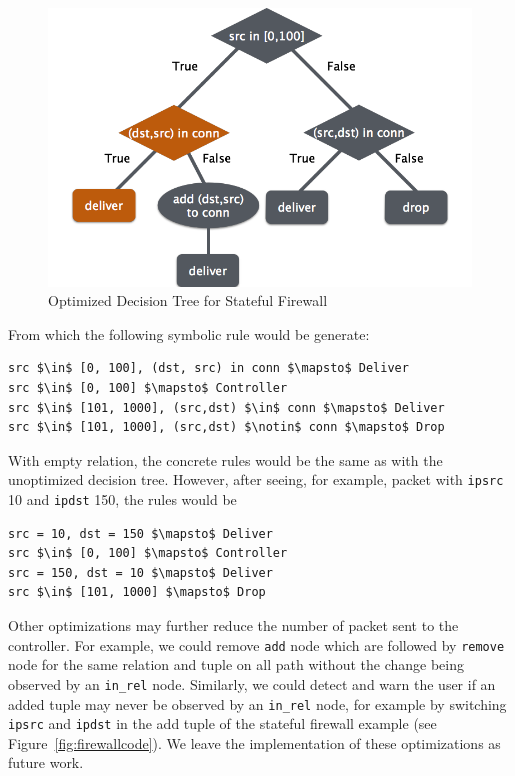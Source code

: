 \documentclass[preprint]{sigplanconf}
\begin{document}
\begin{figure}[ht]
  \includegraphics[scale=.33]{img/optdtree.png}
\caption{Optimized Decision Tree for Stateful Firewall}     
\label{fig:decisiontreeopt}  
  \end{figure}


From which the following symbolic rule would be generate:
\begin{lstlisting}[mathescape]
src $\in$ [0, 100], (dst, src) in conn $\mapsto$ Deliver
src $\in$ [0, 100] $\mapsto$ Controller
src $\in$ [101, 1000], (src,dst) $\in$ conn $\mapsto$ Deliver
src $\in$ [101, 1000], (src,dst) $\notin$ conn $\mapsto$ Drop
\end{lstlisting}

With empty relation, the concrete rules would be the same as with the unoptimized decision tree. However, after seeing, for example, packet with \lstinline|ipsrc| 10 and \lstinline|ipdst| 150, the rules would be
\begin{lstlisting}[mathescape]
src = 10, dst = 150 $\mapsto$ Deliver  
src $\in$ [0, 100] $\mapsto$ Controller  
src = 150, dst = 10 $\mapsto$ Deliver  
src $\in$ [101, 1000] $\mapsto$ Drop  
\end{lstlisting}


Other optimizations may further reduce the number of packet sent to the controller. For example, we could remove \lstinline|add| node which are followed by \lstinline|remove| node for the same relation and tuple on all path without the change being observed by an \lstinline|in_rel| node. Similarly, we could detect and warn the user if an added tuple may never be observed by an \lstinline|in_rel| node, for example by switching \lstinline|ipsrc| and \lstinline|ipdst| in the add tuple of the stateful firewall example (see Figure~\ref{fig:firewallcode}). We leave the implementation of these optimizations as future work.
\end{document}
